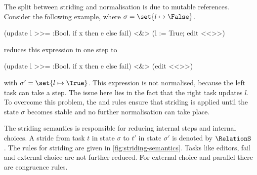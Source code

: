 The split between striding and normalisation is due to mutable references.
Consider the following example, where $\sigma=\set{l\mapsto\False}$.
\begin{TASK}
  (update l >>= \x:Bool. if x then e else fail) <&> (l := True; edit <<>>)
\end{TASK}
\pagebreak[2]
 reduces this expression in one step to
\begin{TASK}
  (update l >>= \x:Bool. if x then e else fail) <&> (edit <<>>)
\end{TASK}
with $\sigma'=\set{l\mapsto\True}$.
This expression is not normalised, because the left task can take a step.
The issue here lies in the fact that the right task updates $l$.
To overcome this problem, the  and  rules ensure that striding is applied until the state $\sigma$ becomes stable and no further normalisation can take place.

The striding semantics is responsible for reducing internal steps and internal choices.
A stride from task $t$ in state $\sigma$ to $t'$ in state $\sigma'$ is denoted by $\RelationS$.
The rules for striding are given in \cref{fig:striding-semantics}.
Tasks like editors, fail and external choice are not further reduced.
For external choice and parallel there are congruence rules.

